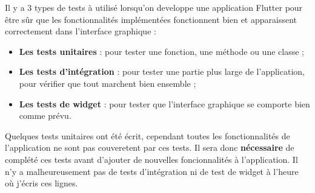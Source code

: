 Il y a 3 types de tests à utilisé lorsqu'on developpe une application Flutter pour être sûr que les fonctionnalités implémentées fonctionnent bien et apparaissent correctement dans l'interface graphique :
\begin{itemize}
  \item \textbf{Les tests unitaires} : pour tester une fonction, une méthode ou une classe ;
  \item \textbf{Les tests d'intégration} : pour tester une partie plus large de l'application, pour vérifier que tout marchent bien ensemble ;
  \item \textbf{Les tests de widget} : pour tester que l'interface graphique se comporte bien comme prévu.
\end{itemize}

Quelques tests unitaires ont été écrit, cependant toutes les fonctionnalités de l'application ne sont pas couveretent par ces tests. Il sera donc \textbf{nécessaire} de complété ces tests avant d'ajouter de nouvelles foncionnalités à l'application. Il n'y a malheureusement pas de tests d'intégration ni de test de widget à l'heure où j'écris ces lignes.





